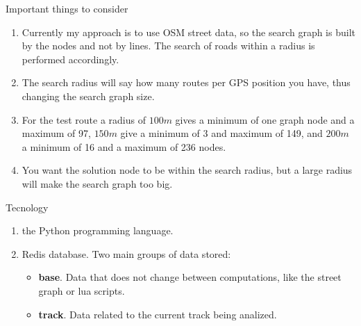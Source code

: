 \documentclass[10pt,letterpaper]{article}
\begin{document}
\begin{section}{Important things to consider}
\begin{enumerate}
	\item Currently my approach is to use OSM street data, so the search graph is built by the nodes and not by lines. The search of roads within a radius is performed accordingly.
	\item The search radius will say how many routes per GPS position you have, thus changing the search graph size.
	\item For the test route a radius of $100m$ gives a minimum of one graph node and a maximum of 97, $150m$ give a minimum of 3 and maximum of 149, and $200m$ a minimum of 16 and a maximum of 236 nodes.
	\item You want the solution node to be within the search radius, but a large radius will make the search graph too big.
\end{enumerate}
\end{section}

\begin{section}{Tecnology}

\begin{enumerate}
	\item the Python programming language.

	\item Redis database. Two main groups of data stored:
	\begin{itemize}
		\item \textbf{base}. Data that does not change between computations, like the street graph or lua scripts.
		\item \textbf{track}. Data related to the current track being analized.
	\end{itemize}
\end{enumerate}

\end{section}
\end{document}
